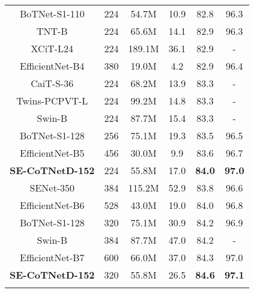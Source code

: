 \documentclass[10pt,twocolumn,letterpaper]{article}
\begin{document}
\begin{table}[!tb]
\begin{tabular}{c|c|cc|cc}
BoTNet-S1-110 \cite{srinivas2021bottleneck}     & 224  & 54.7M  & 10.9   & 82.8       & 96.3       \\
TNT-B \cite{han2021transformer}                 & 224  & 65.6M  & 14.1   & 82.9       & 96.3       \\
XCiT-L24 \cite{el2021xcit}                      & 224  & 189.1M & 36.1   & 82.9       & -          \\
EfficientNet-B4 \cite{tan2019efficientnet}      & 380  & 19.0M  & 4.2    & 82.9       & 96.4       \\
CaiT-S-36 \cite{touvron2021going}               & 224  & 68.2M  & 13.9   & 83.3       & -           \\
Twins-PCPVT-L \cite{chu2021twins}               & 224  & 99.2M  & 14.8   & 83.3       & -          \\
Swin-B \cite{liu2021swin}                       & 224  & 87.7M  & 15.4   & 83.3       & -          \\
BoTNet-S1-128  \cite{srinivas2021bottleneck}    & 256  & 75.1M  & 19.3   & 83.5       & 96.5       \\
EfficientNet-B5 \cite{tan2019efficientnet}      & 456  & 30.0M  & 9.9    & 83.6       & 96.7       \\ \hline
\textbf{SE-CoTNetD-152}                         & 224  & 55.8M  & 17.0   & \textbf{84.0}       & \textbf{97.0}       \\ \hline\hline
SENet-350     \cite{hu2018squeeze}              & 384  & 115.2M & 52.9   & 83.8       & 96.6       \\
EfficientNet-B6 \cite{tan2019efficientnet}      & 528  & 43.0M  & 19.0   & 84.0       & 96.8       \\
BoTNet-S1-128 \cite{srinivas2021bottleneck}     & 320  & 75.1M  & 30.9   & 84.2       & 96.9       \\
Swin-B   \cite{liu2021swin}                     & 384  & 87.7M  & 47.0   & 84.2       & -          \\
EfficientNet-B7 \cite{tan2019efficientnet}      & 600  & 66.0M  & 37.0   & 84.3       & 97.0       \\ \hline
\textbf{SE-CoTNetD-152}                         & 320  & 55.8M  & 26.5   & \textbf{84.6}       & \textbf{97.1}       \\ \Xhline{2\arrayrulewidth}
\end{tabular}
\vspace{-0.26in}
\label{table:r2}
\end{table}
\end{document}
